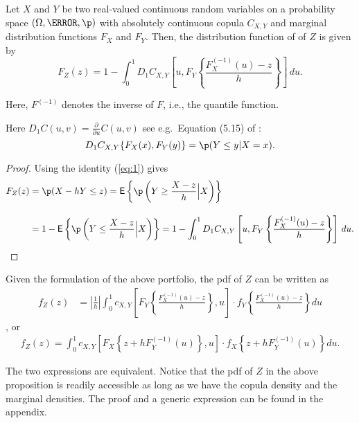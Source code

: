 \begin{proposition}
  \label{prop:dfrh}
  Let $X$ and $Y$ be two real-valued continuous random
  variables on a
  probability space $(\Omega, \F, \p)$ with
  absolutely continuous copula $C_{X, Y}$ and marginal distribution functions $F_{X}$
  and $F_{Y}$. Then, the distribution function of of $Z$ is given by 
  \begin{equation}
    \label{eq:3}
    F_{Z}(z) = 1- \int^1_0 D_1 C_{X, Y}
    \left[ u, F_{Y} \left\{ \frac{F^{(-1)}_{X}(u)-z}{h} \right\}
    \right]\, d u.
  \end{equation}
\end{proposition}
Here, $F^{(-1)}$ denotes the inverse of $F$, i.e., the quantile
function. \medskip

Here $D_1 C(u,v)=\displaystyle \frac{\partial}{\partial u} C(u,v)$ see e.g.\ Equation (5.15) of
\citep{McNeil2005}:
\begin{equation}
  \label{eq:1}
  D_1 C_{X,Y}\{F_X(x), F_Y(y)\} = \p(Y\leq y|X=x).
\end{equation}
\begin{proof}
  Using the identity (\ref{eq:1}) gives
  \begin{align*}
    F_{Z}(z) &= \p(X - h Y\leq z) %
                 = \mbox{\sf E}\left\{\p\left(Y\geq \frac{X-z}{h}\Big|
                 X\right)\right\}\\[10pt]
               &= 1-\mbox{\sf E}\left\{\p\left(Y\leq \frac{X-z}{h}\Big|
                 X\right)\right\}%
               = 1- \int_0^1 D_1 C_{X, Y}\left[u,
                 F_{Y}\left\{\frac{F^{(-1)}_{X}(u) -
                 z}{h}\right\}\right]\, d u.
  \end{align*}
  \end{proof}


\begin{corollary} Given the formulation of the above portfolio, the pdf of $Z$ can be written as
  \begin{align}
  f_{Z}(z) &= \left|\frac{1}{h}\right|\int_0^1 c_{X, Y} \left[
  F_{Y}\left\{\frac{F^{(-1)}_{X}(u)-z}{h}\right\}, u
  \right]
   \cdot
  f_{Y}
  \left\{\frac{F^{(-1)}_{X}(u)-z}{h}\right\} du \label{eq:density1}
  \end{align}, or
    \begin{align}
      f_{Z}(z)
      = \int_0^1 c_{X, Y} \left[
      F_{X}\left\{z + h F^{(-1)}_{Y}(u)\right\}, u
      \right]
       \cdot
      f_{X}
      \left\{
      z+ hF^{(-1)}_{Y}(u)
      \right\} du. \label{eq:density2}
  \end{align}
  \end{corollary}
The two expressions are equivalent.
Notice that the pdf of $Z$ in the above proposition is readily accessible as long as we have
the copula density and the marginal densities.
The proof and a generic expression can be found in the
appendix. \medskip

